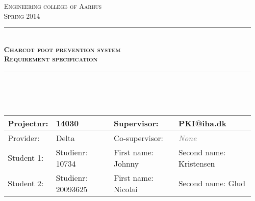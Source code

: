 \newcommand{\HRule}{\rule{\linewidth}{0.5mm}} %

\begin{center} %
 

\textsc{\LARGE Engineering college of Aarhus}\\[1.5cm] %
\textsc{\large Spring 2014}\\[0.5cm] %


\HRule \\[0.4cm]
{ \Large \bfseries \textsc{Charcot foot prevention system}}\\[0.4cm] %
{ \huge \bfseries \textsc{Requirement specification}} %
\HRule \\[1.5cm]
\ \\
\ \\
\vfill
\begin{table}[H]
\centering
    \begin{tabular}{|l|l|l|p{4cm}|}
    \hline
    Projectnr:   & 14030                                                       & Supervisor:             & PKI@iha.dk              \\ \hline
    Provider:    & Delta                                                       & Co-supervisor:          & \textcolor{gray}{\textit{None}}           \\ \hline
    Student  1:  & Studienr: 10734                                             & First name: Johnny      & Second name: Kristensen \\ \hline
    Student  2:  & Studienr: 20093625                                          & First name: Nicolai     & Second name: Glud       \\ \hline
    \end{tabular}


\end{table}
\end{center}
